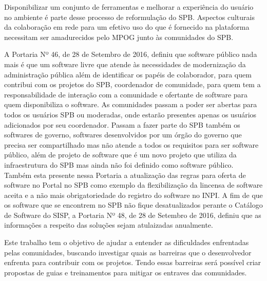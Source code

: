 Disponibilizar um conjunto de ferramentas e melhorar a experiência do usuário no 
ambiente é parte desse processo de reformulação do SPB. Aspectos culturais 
da colaboração em rede para um efetivo uso do que é fornecido na plataforma 
necessitam ser amadurecidos pelo MPOG junto às comunidades do SPB.

A Portaria Nº 46, de 28 de Setembro de 2016, definiu que software público nada mais é
que um software livre que atende às necessidades de modernização da administração 
pública além de identificar os papéis de colaborador, para quem contribui com os projetos do SPB, 
coordenador de comunidade, para quem tem a responsabilidade de interação com a comunidade e 
ofertante de software para quem disponibiliza o software. As comunidades passam a poder
ser abertas para todos os usuários SPB ou moderadas, onde estarão presentes apenas os 
usuários adicionados por seu coordenador. Passam a fazer parte do SPB também os 
softwares de governo, softwares desenvolvidos por um órgão do governo que precisa ser
compartilhado mas não atende a todos os requisitos para ser software público, além de projeto de
software que é um novo projeto que utiliza da infraestrutura do SPB mas ainda não
foi definido como software público.
% 
Também esta presente nessa Portaria a atualização das
regras para oferta de software no Portal no SPB como exemplo da flexibilização
da lincensa de software aceita e a não mais obrigatoriedade do registro do 
software no INPI. 
%
A fim de que os software que se encontrem no SPB não fique desatualizados perante
o Catálogo de Software do SISP, a Portaria Nº 48, de 28 de Setembro de 2016, definiu que 
as informações a respeito das soluções sejam atulaizadas anualmente.

Este trabalho tem o objetivo de ajudar a entender as dificuldades enfrentadas
pelas comunidades, buscando investigar quais as barreiras que o desenvolvedor 
enfrenta para contribuir com os projetos. Tendo essas barreiras será possível
criar propostas de guias e treinamentos para mitigar os entraves das comunidades.  

